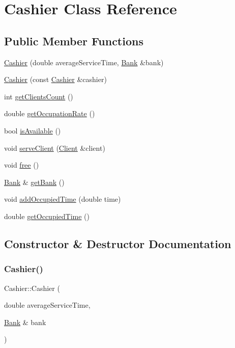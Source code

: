 \hypertarget{classCashier}{}\section{Cashier Class Reference}
\label{classCashier}
\subsection*{Public Member Functions}
\begin{DoxyCompactItemize}
\item 
\hyperlink{classCashier_a1616d49e92657698805bb9672df8c019}{Cashier} (double average\+Service\+Time, \hyperlink{classBank}{Bank} \&bank)
\item 
\hyperlink{classCashier_a1a4f6f058122e7c8d47eae5e64334ed6}{Cashier} (const \hyperlink{classCashier}{Cashier} \&cashier)
\item 
int \hyperlink{classCashier_a50d3d5779132b3806958d0e57aea7a34}{get\+Clients\+Count} ()
\item 
double \hyperlink{classCashier_ac0c91ebe2a9ca9428537e79b82bfbe9f}{get\+Occupation\+Rate} ()
\item 
bool \hyperlink{classCashier_a37d66e1a5f77c8f5cb8d77ef0b43e2e8}{is\+Available} ()
\item 
void \hyperlink{classCashier_a98be1361808932fb8a2fa4c294dcf09a}{serve\+Client} (\hyperlink{classClient}{Client} \&client)
\item 
void \hyperlink{classCashier_ac04b7595d1d7e51dd673590809cb5682}{free} ()
\item 
\hyperlink{classBank}{Bank} \& \hyperlink{classCashier_aa60d8270fa27302302b80a810c53a8f9}{get\+Bank} ()
\item 
void \hyperlink{classCashier_a571d08400e1d738163252caa61cbd165}{add\+Occupied\+Time} (double time)
\item 
double \hyperlink{classCashier_a1123f41f1643d9cce2e502243b2aa5b3}{get\+Occupied\+Time} ()
\end{DoxyCompactItemize}


\subsection{Constructor \& Destructor Documentation}
\mbox{\label{classCashier_a1616d49e92657698805bb9672df8c019}} 
\subsubsection{\texorpdfstring{Cashier()}{Cashier()}\hspace{0.1cm}{\footnotesize\ttfamily [1/2]}}
{\footnotesize\ttfamily Cashier\+::\+Cashier (\begin{DoxyParamCaption}\item[{double}]{average\+Service\+Time,  }\item[{\hyperlink{classBank}{Bank} \&}]{bank }\end{DoxyParamCaption})}

